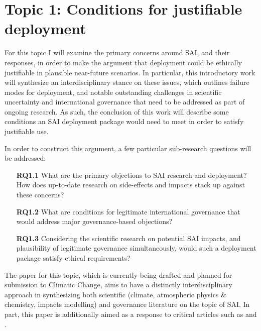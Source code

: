 \documentclass{article}
\begin{document}
\begin{enumerate}
\end{enumerate}



\section*{Topic 1: Conditions for justifiable deployment}
\label{Topic1}
For this topic I will examine the primary concerns around SAI, and their responses, in order to make the argument that deployment could be ethically justifiable in plausible near-future scenarios. In particular, this introductory work will synthesize an interdisciplinary stance on these issues, which outlines failure modes for deployment, and notable outstanding challenges in scientific uncertainty \citep{kravitz2020uncertainty} and international governance \citep{reynolds2019solar} that need to be addressed as part of ongoing research. As such, the conclusion of this work will describe some conditions an SAI deployment package would need to meet in order to satisfy justifiable use.

In order to construct this argument, a few particular sub-research questions will be addressed: 

\begin{enumerate}
    \item[\textbf{RQ1.1}] What are the primary objections to SAI research and deployment? How does up-to-date research on side-effects and impacts stack up against these concerns?
    \item[\textbf{RQ1.2}] What are conditions for legitimate international governance that would address major governance-based objections?
    \item[\textbf{RQ1.3}] Considering the scientific research on potential SAI impacts, and plausibility of legitimate governance simultaneously, would such a deployment package satisfy ethical requirements?

\end{enumerate}

The paper for this topic, which is currently being drafted and planned for submission to Climatic Change, aims to have a distinctly interdisciplinary approach in synthesizing both scientific (climate, atmospheric physics \& chemistry, impacts modelling) and governance literature on the topic of SAI. In part, this paper is additionally aimed as a response to critical articles such as \cite{pierrehumbert2019there} and \cite{robock200820}.
 
\end{document}
